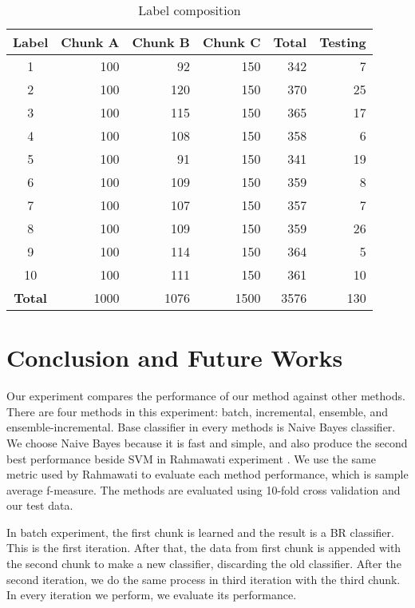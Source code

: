 \documentclass[conference]{IEEEtran}
\begin{document}
\begin{table}[!htb]
\renewcommand{\arraystretch}{1.3}
\caption{Label composition}
\label{label_compos}
\centering
\begin{tabular}{|c|r|r|r|r|r|}
    \hline
    Label & Chunk A & Chunk B & Chunk C & \textbf{Total} & Testing\\
    \hline
    1 & 100 & 92 & 150 & 342 & 7\\
    \hline
    2 & 100 & 120 & 150 & 370 & 25\\
    \hline
    3 & 100 & 115 & 150 & 365 & 17\\
    \hline
    4 & 100 & 108 & 150 & 358 & 6\\
    \hline
    5 & 100 & 91 & 150 & 341 & 19\\
    \hline
    6 & 100 & 109 & 150 & 359 & 8\\
    \hline
    7 & 100 & 107 & 150 & 357 & 7\\
    \hline
    8 & 100 & 109 & 150 & 359 & 26\\
    \hline
    9 & 100 & 114 & 150 & 364 & 5\\
    \hline
    10 & 100 & 111 & 150 & 361 & 10\\
    \hline
    \textbf{Total} & 1000 & 1076 & 1500 & 3576 & 130\\
    \hline
\end{tabular}
\end{table}

\section{Conclusion and Future Works}

Our experiment compares the performance of our method against other methods.
There are four methods in this experiment: batch, incremental, ensemble, and ensemble-incremental.
Base classifier in every methods is Naive Bayes classifier.
We choose Naive Bayes because it is fast and simple, and also produce the second best performance beside SVM in Rahmawati experiment \cite{rahma}.
We use the same metric used by Rahmawati to evaluate each method performance, which is sample average f-measure.
The methods are evaluated using 10-fold cross validation and our test data.

In batch experiment, the first chunk is learned and the result is a BR classifier.
This is the first iteration.
After that, the data from first chunk is appended with the second chunk to make a new classifier, discarding the old classifier.
After the second iteration, we do the same process in third iteration with the third chunk.
In every iteration we perform, we evaluate its performance.
\end{document}
